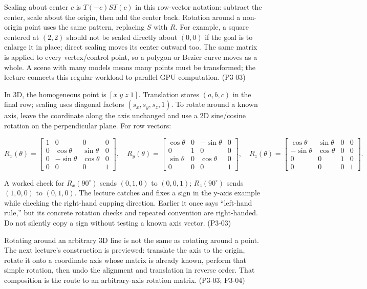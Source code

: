 Scaling about center \(c\) is \(T(-c)ST(c)\) in this row-vector notation: subtract the center, scale about the origin, then add the center back. Rotation around a non-origin point uses the same pattern, replacing \(S\) with \(R\). For example, a square centered at \((2,2)\) should not be scaled directly about \((0,0)\) if the goal is to enlarge it in place; direct scaling moves its center outward too. The same matrix is applied to every vertex/control point, so a polygon or Bezier curve moves as a whole. A scene with many models means many points must be transformed; the lecture connects this regular workload to parallel GPU computation. (P3-03)

In 3D, the homogeneous point is \([x\;y\;z\;1]\). Translation stores \((a,b,c)\) in the final row; scaling uses diagonal factors \((s_x,s_y,s_z,1)\). To rotate around a known axis, leave the coordinate along the axis unchanged and use a 2D sine/cosine rotation on the perpendicular plane. For row vectors:

\[
R_x(\theta)=\begin{bmatrix}1&0&0&0\\0&\cos\theta&\sin\theta&0\\0&-\sin\theta&\cos\theta&0\\0&0&0&1\end{bmatrix},\quad
R_y(\theta)=\begin{bmatrix}\cos\theta&0&-\sin\theta&0\\0&1&0&0\\\sin\theta&0&\cos\theta&0\\0&0&0&1\end{bmatrix},\quad
R_z(\theta)=\begin{bmatrix}\cos\theta&\sin\theta&0&0\\-\sin\theta&\cos\theta&0&0\\0&0&1&0\\0&0&0&1\end{bmatrix}.
\]

A worked check for \(R_x(90^\circ)\) sends \((0,1,0)\) to \((0,0,1)\); \(R_z(90^\circ)\) sends \((1,0,0)\) to \((0,1,0)\). The lecture catches and fixes a sign in the y-axis example while checking the right-hand cupping direction. Earlier it once says ``left-hand rule,'' but its concrete rotation checks and repeated convention are right-handed. Do not silently copy a sign without testing a known axis vector. (P3-03)

Rotating around an arbitrary 3D line is not the same as rotating around a point. The next lecture's construction is previewed: translate the axis to the origin, rotate it onto a coordinate axis whose matrix is already known, perform that simple rotation, then undo the alignment and translation in reverse order. That composition is the route to an arbitrary-axis rotation matrix. (P3-03; P3-04)

